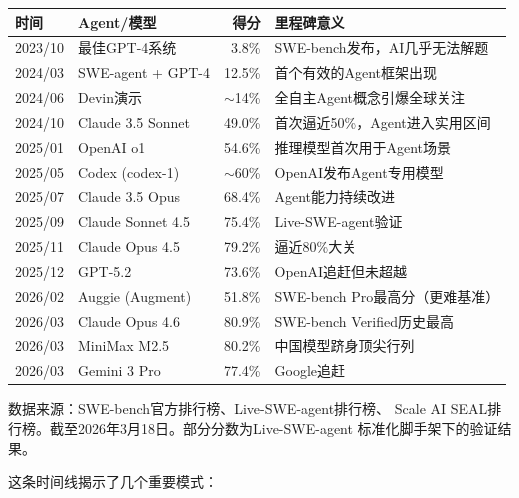\begin{keybox}
\small
\begin{tabularx}{\textwidth}{l l r X}
\toprule
\rowcolor{figLightGray}
\textbf{时间} & \textbf{Agent/模型} & \textbf{得分} & \textbf{里程碑意义} \\
\midrule
2023/10  & 最佳GPT-4系统      & 3.8\%    & SWE-bench发布，AI几乎无法解题 \\
2024/03  & SWE-agent + GPT-4  & 12.5\%   & 首个有效的Agent框架出现 \\
2024/06  & Devin演示          & $\sim$14\%  & 全自主Agent概念引爆全球关注 \\
2024/10  & Claude 3.5 Sonnet  & 49.0\%  & 首次逼近50\%，Agent进入实用区间 \\
2025/01  & OpenAI o1          & 54.6\%  & 推理模型首次用于Agent场景 \\
2025/05  & Codex (codex-1)    & $\sim$60\% & OpenAI发布Agent专用模型 \\
2025/07  & Claude 3.5 Opus    & 68.4\%  & Agent能力持续改进 \\
2025/09  & Claude Sonnet 4.5  & 75.4\%  & Live-SWE-agent验证 \\
2025/11  & Claude Opus 4.5    & 79.2\%  & 逼近80\%大关 \\
2025/12  & GPT-5.2            & 73.6\%  & OpenAI追赶但未超越 \\
2026/02  & Auggie (Augment)   & 51.8\%  & SWE-bench Pro最高分（更难基准）\\
2026/03  & Claude Opus 4.6    & 80.9\%  & SWE-bench Verified历史最高 \\
2026/03  & MiniMax M2.5       & 80.2\%  & 中国模型跻身顶尖行列 \\
2026/03  & Gemini 3 Pro       & 77.4\%  & Google追赶 \\
\bottomrule
\end{tabularx}

\medskip
\noindent 数据来源：SWE-bench官方排行榜、Live-SWE-agent排行榜、
Scale AI SEAL排行榜。截至2026年3月18日。部分分数为Live-SWE-agent
标准化脚手架下的验证结果。
\end{keybox}

这条时间线揭示了几个重要模式：

